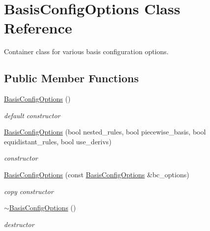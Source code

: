 \section{Basis\+Config\+Options Class Reference}
\label{classPecos_1_1BasisConfigOptions}


Container class for various basis configuration options.  


\subsection*{Public Member Functions}
\begin{DoxyCompactItemize}
\item 
\hyperlink{classPecos_1_1BasisConfigOptions_aab01805a888bbe54c41551f605b1b1fb}{Basis\+Config\+Options} ()\label{classPecos_1_1BasisConfigOptions_aab01805a888bbe54c41551f605b1b1fb}

\begin{DoxyCompactList}\small\item\em default constructor \end{DoxyCompactList}\item 
\hyperlink{classPecos_1_1BasisConfigOptions_a85bcdd68242189b0a986362296b8e3a9}{Basis\+Config\+Options} (bool nested\+\_\+rules, bool piecewise\+\_\+basis, bool equidistant\+\_\+rules, bool use\+\_\+derivs)\label{classPecos_1_1BasisConfigOptions_a85bcdd68242189b0a986362296b8e3a9}

\begin{DoxyCompactList}\small\item\em constructor \end{DoxyCompactList}\item 
\hyperlink{classPecos_1_1BasisConfigOptions_a92287b6200f91c9dacce4a3d1e3e9f98}{Basis\+Config\+Options} (const \hyperlink{classPecos_1_1BasisConfigOptions}{Basis\+Config\+Options} \&bc\+\_\+options)\label{classPecos_1_1BasisConfigOptions_a92287b6200f91c9dacce4a3d1e3e9f98}

\begin{DoxyCompactList}\small\item\em copy constructor \end{DoxyCompactList}\item 
\hyperlink{classPecos_1_1BasisConfigOptions_af794c3cf22cc067a10b5bc65ce1838cd}{$\sim$\+Basis\+Config\+Options} ()\label{classPecos_1_1BasisConfigOptions_af794c3cf22cc067a10b5bc65ce1838cd}

\begin{DoxyCompactList}\small\item\em destructor \end{DoxyCompactList}\end{DoxyCompactItemize}

